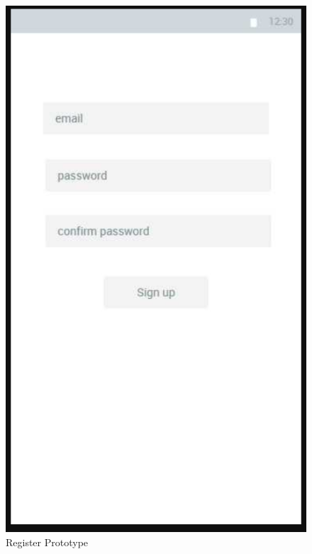 \begin{figure}[h!]
\begin{minipage}[t]{0.48\textwidth}
\includegraphics[width=\linewidth,keepaspectratio=true]{img/register_mock.PNG}
\caption{Register Prototype}
\label{fig:Register Prototype}
\end{minipage}
\end{figure}


